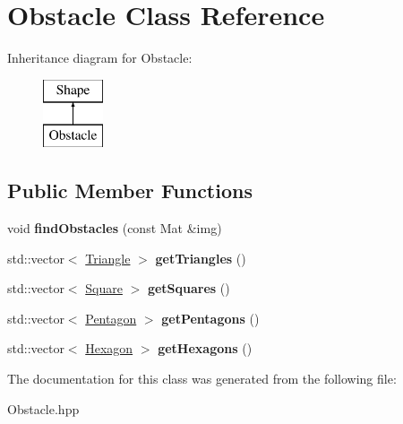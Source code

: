 \hypertarget{class_obstacle}{}\section{Obstacle Class Reference}
\label{class_obstacle}
Inheritance diagram for Obstacle\+:\begin{figure}[H]
\begin{center}
\leavevmode
\includegraphics[height=2.000000cm]{class_obstacle}
\end{center}
\end{figure}
\subsection*{Public Member Functions}
\begin{DoxyCompactItemize}
\item 
\mbox{\label{class_obstacle_ae333b23b742b38e50be13bc7aec2da5b}} 
void {\bfseries find\+Obstacles} (const Mat \&img)
\item 
\mbox{\label{class_obstacle_a4b995e62a7aece596b2e42c63cdf5e28}} 
std\+::vector$<$ \mbox{\hyperlink{class_triangle}{Triangle}} $>$ {\bfseries get\+Triangles} ()
\item 
\mbox{\label{class_obstacle_a53daef38dbe68e85696abc8ed03cf4b2}} 
std\+::vector$<$ \mbox{\hyperlink{class_square}{Square}} $>$ {\bfseries get\+Squares} ()
\item 
\mbox{\label{class_obstacle_a2a3f85aa41ff39922c3994154fa8a7c1}} 
std\+::vector$<$ \mbox{\hyperlink{class_pentagon}{Pentagon}} $>$ {\bfseries get\+Pentagons} ()
\item 
\mbox{\label{class_obstacle_a472a93843d84f1275c5b9cd57aa53850}} 
std\+::vector$<$ \mbox{\hyperlink{class_hexagon}{Hexagon}} $>$ {\bfseries get\+Hexagons} ()
\end{DoxyCompactItemize}


The documentation for this class was generated from the following file\+:\begin{DoxyCompactItemize}
\item 
Obstacle.\+hpp\end{DoxyCompactItemize}

